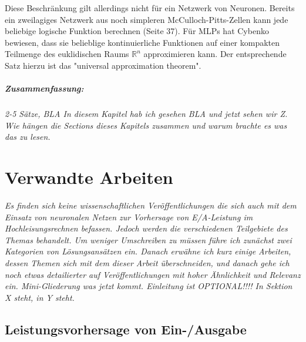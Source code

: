 \documentclass[
	12pt,
	a4paper,
	BCOR10mm,
	DIV14,
	listof=totoc,
	bibliography=totoc,
	headsepline
]{scrreprt}
\begin{document}
Diese Beschränkung gilt allerdings nicht für ein Netzwerk von Neuronen. Bereits ein zweilagiges Netzwerk aus noch simpleren McCulloch-Pitts-Zellen kann jede beliebige logische Funktion berechnen \cite{Rojas:1996:NNS:235222} (Seite 37).
Für MLPs hat Cybenko \cite{cybenko:mcss} bewiesen, dass sie belieblige kontinuierliche Funktionen auf einer kompakten Teilmenge des euklidischen Raums $\mathbb{R}^n$ approximieren kann. Der entsprechende Satz hierzu ist das "universal approximation theorem".

\bigskip
\paragraph{Zusammenfassung:}
\textit{2-5 Sätze, BLA In diesem Kapitel hab ich gesehen BLA und jetzt sehen wir Z. Wie hängen die Sections dieses Kapitels zusammen und warum brachte es was das zu lesen.}


\chapter{Verwandte Arbeiten}
\textit{%
	Es finden sich keine wissenschaftlichen Veröffentlichungen die sich auch mit dem Einsatz von neuronalen Netzen zur Vorhersage von E/A-Leistung im Hochleisungsrechnen befassen. Jedoch werden die verschiedenen Teilgebiete des Themas behandelt. Um weniger Umschreiben zu müssen führe ich zunächst zwei Kategorien von Lösungsansätzen ein. Danach erwähne ich kurz einige Arbeiten, dessen Themen sich mit dem dieser Arbeit überschneiden, und danach gehe ich noch etwas detailierter auf Veröffentlichungen mit hoher Ähnlichkeit und Relevanz ein.  
	Mini-Gliederung was jetzt kommt. Einleitung ist OPTIONAL!!!!
	In Sektion X steht, in Y steht.
}
\bigskip

\section{Leistungsvorhersage von Ein-/Ausgabe}
\end{document}
